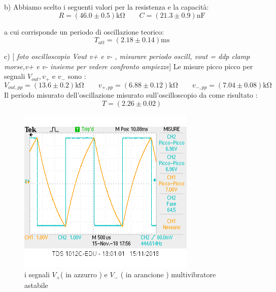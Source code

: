 \documentclass[10pt,a4paper]{article}
\newcommand{\rem}[1]{[\emph{#1}]}
\begin{document}
b) Abbiamo scelto i seguenti valori per la resistenza e la capacità:
\[ R = ( 46.0 \pm0.5 )\si{\kilo\ohm} \qquad   C = (21.3\pm0.9 )\si{\nano \farad}\]

a cui corrisponde un periodo di oscillazione teorico:
\[T_{att}= (2.18\pm 0.14 )\si{\milli \second}\]



c) \rem{ foto oscilloscopio Vout v+ e v- , misurare periodo oscill,  vout = ddp clamp morse,v+ e v- insieme per vedere confronto ampiezze}
Le misure picco picco per  segnali  $V_{out}, v_{+}$ e $v_{-}$ sono :
\[ V_{out,pp}= (13.6\pm 0.2)\si{\kilo\ohm} \qquad  v_{+,pp}= (6.88 \pm 0.12)\si{\kilo\ohm} \qquad   v_{-,pp}= ( 7.04 \pm0.08 ) \si{\kilo\ohm}\]
Il periodo misurato dell'oscillazione misurato sull'oscilloscopio da come risultato :
\[ T = (2.26 \pm 0.02)\]




\begin{figure}[h]
	\begin{center}
		
			\includegraphics[scale=0.8]{v+_v-.png}
		\caption{\small i segnali $V_+$( in azzurro ) e $ V_-$ ( in arancione )  multivibratore astabile}

		\label{fig:v+v-}
	\end{center}

\end{figure}
\end{document}
